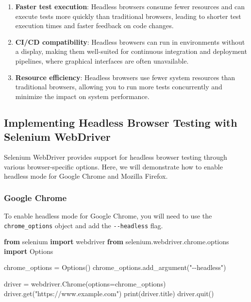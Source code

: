 \documentclass[
  paper=a4,
  ,captions=tableheading
]{scrartcl}
\newenvironment{Shaded}{}{}
\newcommand{\BuiltInTok}[1]{\textcolor[rgb]{0.00,0.50,0.00}{#1}}
\newcommand{\ImportTok}[1]{\textcolor[rgb]{0.00,0.50,0.00}{\textbf{#1}}}
\newcommand{\NormalTok}[1]{#1}
\newcommand{\OperatorTok}[1]{\textcolor[rgb]{0.40,0.40,0.40}{#1}}
\newcommand{\StringTok}[1]{\textcolor[rgb]{0.25,0.44,0.63}{#1}}
\begin{document}
\begin{enumerate}
\def\labelenumi{\arabic{enumi}.}
\item
  \textbf{Faster test execution}: Headless browsers consume fewer
  resources and can execute tests more quickly than traditional
  browsers, leading to shorter test execution times and faster feedback
  on code changes.
\item
  \textbf{CI/CD compatibility}: Headless browsers can run in
  environments without a display, making them well-suited for continuous
  integration and deployment pipelines, where graphical interfaces are
  often unavailable.
\item
  \textbf{Resource efficiency}: Headless browsers use fewer system
  resources than traditional browsers, allowing you to run more tests
  concurrently and minimize the impact on system performance.
\end{enumerate}

\hypertarget{implementing-headless-browser-testing-with-selenium-webdriver}{%
\subsection{Implementing Headless Browser Testing with Selenium
WebDriver}\label{implementing-headless-browser-testing-with-selenium-webdriver}}

Selenium WebDriver provides support for headless browser testing through
various browser-specific options. Here, we will demonstrate how to
enable headless mode for Google Chrome and Mozilla Firefox.

\hypertarget{google-chrome}{%
\subsubsection{Google Chrome}\label{google-chrome}}

To enable headless mode for Google Chrome, you will need to use the
\texttt{chrome\_options} object and add the \texttt{-\/-headless} flag.

\begin{Shaded}
\begin{Highlighting}[]
\ImportTok{from}\NormalTok{ selenium }\ImportTok{import}\NormalTok{ webdriver}
\ImportTok{from}\NormalTok{ selenium.webdriver.chrome.options }\ImportTok{import}\NormalTok{ Options}

\NormalTok{chrome\_options }\OperatorTok{=}\NormalTok{ Options()}
\NormalTok{chrome\_options.add\_argument(}\StringTok{"{-}{-}headless"}\NormalTok{)}

\NormalTok{driver }\OperatorTok{=}\NormalTok{ webdriver.Chrome(options}\OperatorTok{=}\NormalTok{chrome\_options)}
\NormalTok{driver.get(}\StringTok{"https://www.example.com"}\NormalTok{)}
\BuiltInTok{print}\NormalTok{(driver.title)}
\NormalTok{driver.quit()}
\end{Highlighting}
\end{Shaded}
\end{document}
